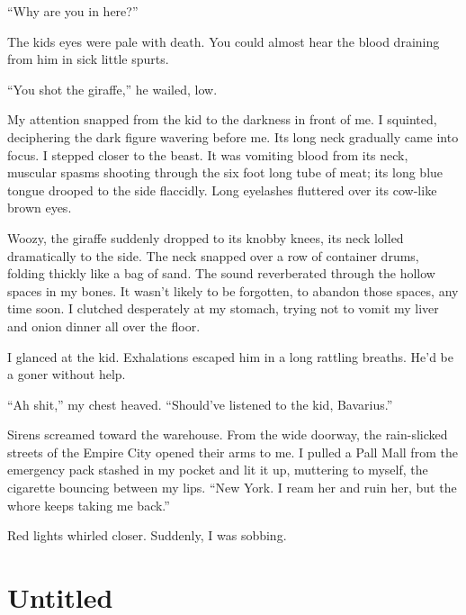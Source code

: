 ``Why are you in here?''



The kids eyes were pale with death. You could almost hear the blood
draining from him in sick little spurts.



``You shot the giraffe,'' he wailed, low.



My attention snapped from the kid to the darkness in front of me. I
squinted, deciphering the dark figure wavering before me. Its long
neck gradually came into focus. I stepped closer to the beast. It
was vomiting blood from its neck, muscular spasms shooting through
the six foot long tube of meat; its long blue tongue drooped to the
side flaccidly. Long eyelashes fluttered over its cow-like brown
eyes.



Woozy, the giraffe suddenly dropped to its knobby knees, its neck
lolled dramatically to the side. The neck snapped over a row of
container drums, folding thickly like a bag of sand. The sound
reverberated through the hollow spaces in my bones. It wasn't
likely to be forgotten, to abandon those spaces, any time soon. I
clutched desperately at my stomach, trying not to vomit my liver
and onion dinner all over the floor.



I glanced at the kid. Exhalations escaped him in a long rattling
breaths. He'd be a goner without help.



``Ah shit,'' my chest heaved. ``Should've listened
to the kid, Bavarius.''



Sirens screamed toward the warehouse. From the wide doorway, the
rain-slicked streets of the Empire City opened their arms to me. I
pulled a Pall Mall from the emergency pack stashed in my pocket and
lit it up, muttering to myself, the cigarette bouncing between my
lips. ``New York. I ream her and ruin her, but the whore keeps
taking me back.''



Red lights whirled closer. Suddenly, I was sobbing. 

 



\chapter{Untitled}


